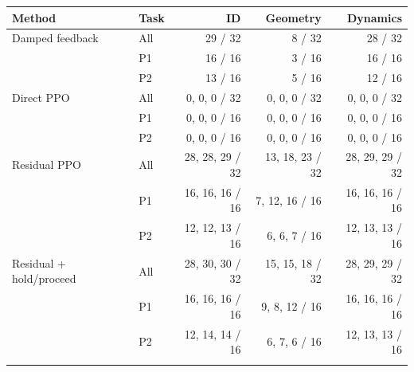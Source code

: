 \begin{tabular}{llrrr}
\toprule
Method & Task & ID & Geometry & Dynamics \\
\midrule
Damped feedback & All & 29 / 32 & 8 / 32 & 28 / 32 \\
 & P1 & 16 / 16 & 3 / 16 & 16 / 16 \\
 & P2 & 13 / 16 & 5 / 16 & 12 / 16 \\
\addlinespace
Direct PPO & All & 0, 0, 0 / 32 & 0, 0, 0 / 32 & 0, 0, 0 / 32 \\
 & P1 & 0, 0, 0 / 16 & 0, 0, 0 / 16 & 0, 0, 0 / 16 \\
 & P2 & 0, 0, 0 / 16 & 0, 0, 0 / 16 & 0, 0, 0 / 16 \\
\addlinespace
Residual PPO & All & 28, 28, 29 / 32 & 13, 18, 23 / 32 & 28, 29, 29 / 32 \\
 & P1 & 16, 16, 16 / 16 & 7, 12, 16 / 16 & 16, 16, 16 / 16 \\
 & P2 & 12, 12, 13 / 16 & 6, 6, 7 / 16 & 12, 13, 13 / 16 \\
\addlinespace
Residual + hold/proceed & All & 28, 30, 30 / 32 & 15, 15, 18 / 32 & 28, 29, 29 / 32 \\
 & P1 & 16, 16, 16 / 16 & 9, 8, 12 / 16 & 16, 16, 16 / 16 \\
 & P2 & 12, 14, 14 / 16 & 6, 7, 6 / 16 & 12, 13, 13 / 16 \\
\addlinespace
\bottomrule
\end{tabular}
